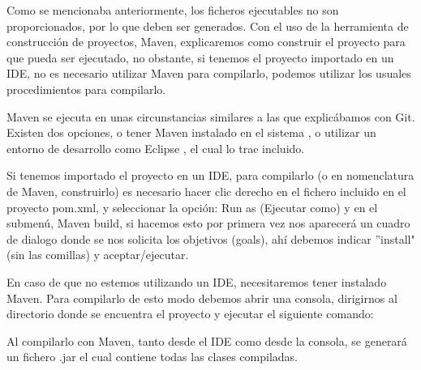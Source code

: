 Como se mencionaba anteriormente, los ficheros ejecutables no son proporcionados, por lo que deben ser generados. Con el uso de la herramienta de construcción de proyectos, Maven, explicaremos como construir el proyecto para que pueda ser ejecutado, no obstante, si tenemos el proyecto importado en un IDE, no es necesario utilizar Maven para compilarlo, podemos utilizar los usuales procedimientos para compilarlo.


Maven se ejecuta en unas circunstancias similares a las que explicábamos con Git. Existen dos opciones, o tener Maven instalado en el sistema \cite{instalacion_maven}, o utilizar un entorno de desarrollo como Eclipse \cite{eclipse}, el cual lo trae incluido. 

Si tenemos importado el proyecto en un IDE, para compilarlo (o en nomenclatura de Maven, construirlo) es necesario hacer clic derecho en el fichero incluido en el proyecto pom.xml, y seleccionar la opción: Run as (Ejecutar como) y en el submen\'u, Maven build, si hacemos esto por primera vez nos aparecerá un cuadro de dialogo donde se nos solicita los objetivos (goals), ah\'i debemos indicar ''install" (sin las comillas) y aceptar/ejecutar. 

En caso de que no estemos utilizando un IDE, necesitaremos tener instalado Maven. Para compilarlo de esto modo debemos abrir una consola, dirigirnos al directorio donde se encuentra el proyecto y ejecutar el siguiente comando:


Al compilarlo con Maven, tanto desde el IDE como desde la consola, se generar\'a un fichero .jar el cual contiene todas las clases compiladas.